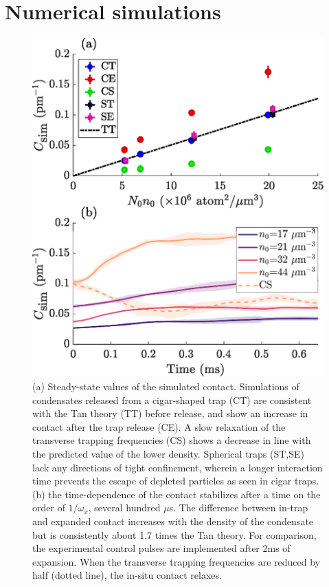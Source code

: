 \section{Numerical simulations}
\label{STAB}
	\begin{figure}[b]
	        \includegraphics[width=\columnwidth]{fig/depletion/sim_results}
	        \caption{(a) Steady-state values of the simulated contact. Simulations of condensates released from a cigar-shaped trap (CT) are consistent with the Tan theory (TT) before release, and show an increase in contact after the trap release (CE). A slow relaxation of the transverse trapping frequencies (CS) shows a decrease in line with the predicted value of the lower density. Spherical traps (ST,SE) lack any directions of tight confinement, wherein a longer interaction time prevents the escape of depleted particles as seen in cigar traps. (b) the time-dependence of the contact stabilizes after a time on the order of $1/\omega_x$, several hundred $\mu$s. The difference between in-trap and expanded contact increases with the density of the condensate but is consistently about 1.7 times the Tan theory. For comparison, the experimental control pulses are implemented after 2ms of expansion. When the transverse trapping frequencies are reduced by half (dotted line), the in-situ contact relaxes.}
	        \label{fig:sim_fig}
	\end{figure}
